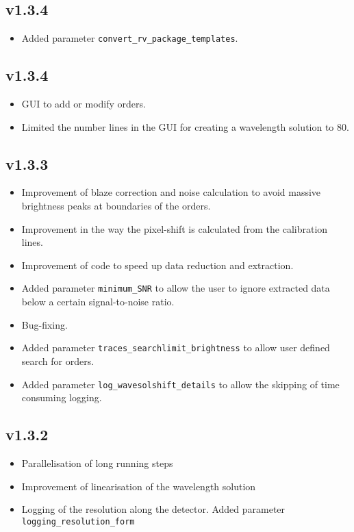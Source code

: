\documentclass[10pt,a4paper]{article}
\begin{document}
\subsection*{v1.3.4}
\begin{itemize}\setlength\itemsep{0em}
  \item Added parameter \verb|convert_rv_package_templates|.
\end{itemize}

\subsection*{v1.3.4}
\begin{itemize}\setlength\itemsep{0em}
  \item GUI to add or modify orders.
  \item Limited the number lines in the GUI for creating a wavelength solution to 80.
\end{itemize}

\subsection*{v1.3.3}
\begin{itemize}\setlength\itemsep{0em}
  \item Improvement of blaze correction and noise calculation to avoid massive brightness peaks at boundaries of the orders.
  \item Improvement in the way the pixel-shift is calculated from the calibration lines.
  \item Improvement of code to speed up data reduction and extraction.
  \item Added parameter \verb|minimum_SNR| to allow the user to ignore extracted data below a certain signal-to-noise ratio.
  \item Bug-fixing.
  \item Added parameter \verb|traces_searchlimit_brightness| to allow user defined search for orders.
  \item Added parameter \verb|log_wavesolshift_details| to allow the skipping of time consuming logging.
\end{itemize}

\subsection*{v1.3.2}
\begin{itemize}\setlength\itemsep{0em}
  \item Parallelisation of long running steps
  \item Improvement of linearisation of the wavelength solution
  \item Logging of the resolution along the detector. Added parameter \verb|logging_resolution_form|
\end{itemize}
\end{document}
